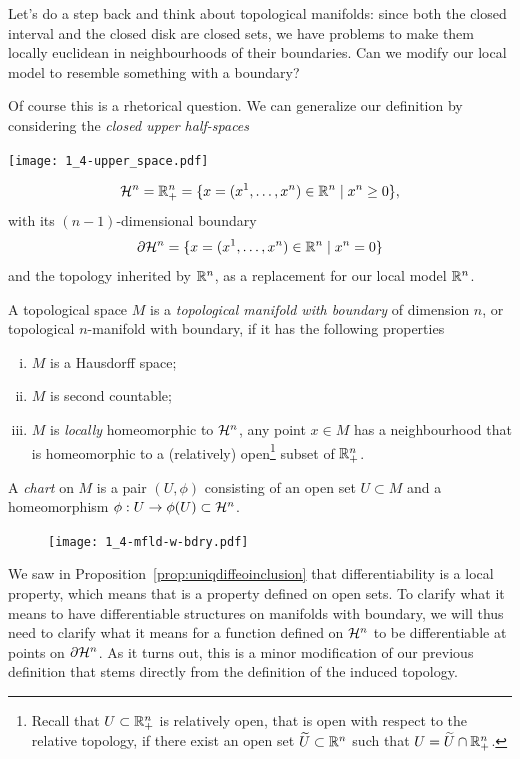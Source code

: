 Let's do a step back and think about topological manifolds: since both the closed interval and the closed disk are closed sets, we have problems to make them locally euclidean in neighbourhoods of their boundaries.
Can we modify our local model to resemble something with a boundary?

Of course this is a rhetorical question.
We can generalize our definition by considering the \emph{closed upper half-spaces}
\begin{marginfigure}[2em]
  \texttt{[image: 1\_4-upper\_space.pdf]}
\end{marginfigure}
\begin{equation}
  \mathcal{H}^n = \mathbb{R}_+^n = \{x=(x^1, \ldots, x^n)\in\mathbb{R}^n\mid x^n \geq 0\},
\end{equation}
with its $(n-1)$-dimensional boundary
\begin{equation}
  \partial\mathcal{H}^n = \{x=(x^1, \ldots, x^n)\in\mathbb{R}^n\mid x^n = 0\}
\end{equation}
and the topology inherited by $\mathbb{R}^n$, as a replacement for our local model $\mathbb{R}^n$.

\begin{definition}
  A topological space $M$ is a \emph{topological manifold with boundary} of dimension $n$, or topological $n$-manifold with boundary, if it has the following properties
  \begin{enumerate}[(i)]
    \item $M$ is a Hausdorff space;
    \item $M$ is second countable;
    \item $M$ is \emph{locally} homeomorphic to $\mathcal{H}^n$, any point $x\in M$ has a neighbourhood that is homeomorphic to a (relatively) open\footnote{Recall that $U\subset\mathbb{R}^n_+$ is relatively open, that is open with respect to the relative topology, if there exist an open set $\widetilde U\subset\mathbb{R}^n$ such that $U = \widetilde U \cap \mathbb{R}^n_+$.} subset of $\mathbb{R}^n_+$.
  \end{enumerate}

  A \emph{chart} on $M$ is a pair $(U, \phi)$ consisting of an open set $U\subset M$ and a homeomorphism $\phi: U \to \phi(U)\subset \mathcal{H}^n$.
\end{definition}

\begin{figure}
  \texttt{[image: 1\_4-mfld-w-bdry.pdf]}
\end{figure}

We saw in Proposition~\ref{prop:uniqdiffeoinclusion} that differentiability is a local property, which means that is a property defined on open sets.
To clarify what it means to have differentiable structures on manifolds with boundary, we will thus need to clarify what it means for a function defined on $\mathcal{H}^n$ to be differentiable at points on $\partial\mathcal{H}^n$.
As it turns out, this is a minor modification of our previous definition that stems directly from the definition of the induced topology.

